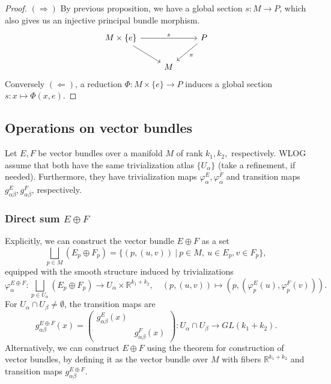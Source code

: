 \documentclass[10pt, a4paper]{article}
\newenvironment{noticeC}{%
  \tcolorbox[%
  notitle,
  empty,
  enhanced,  %
  breakable,
  coltext=black, 
  fontupper=\rmfamily,
  noparskip,
  sharp corners,
  boxrule=-1pt,  %
  frame hidden,
  left=7pt,  %
  right=7pt,
  top=5pt,
  bottom=5pt,
  before skip=2.5ex plus 2pt,
  after skip=2.5ex plus 2pt,
  overlay unbroken and last={%
  },
  ]}
{\endtcolorbox}
\newenvironment{myproof}%
  {\begin{noticeC}\begin{proof}}%
  {\end{proof}\end{noticeC}}
\newcommand{\R}{\mathbb {R}}
\begin{document}
\begin{myproof}
  $(\Rightarrow)$ By previous proposition, we have a global section $s: M \to P$, which also gives us an injective principal bundle morphism.
  \[\begin{tikzcd}
    {M \times \{e\}} && P \\
    & M
    \arrow["s", from=1-1, to=1-3]
    \arrow[from=1-1, to=2-2]
    \arrow["\pi", from=1-3, to=2-2]
  \end{tikzcd}\]
  Conversely $(\Leftarrow)$, a reduction $\Phi: M \times \{e\} \to P$ induces a global section $s: x \mapsto \Phi(x, e)$.
\end{myproof}

\subsection{Operations on vector bundles}

Let $E, F$ be vector bundles over a manifold $M$ of rank $k_1, k_2,$ respectively.
WLOG assume that both have the same trivialization atlas $\{U_\alpha\}$ (take a refinement, if needed).
Furthermore, they have trivialization maps $\varphi_\alpha ^E, \varphi_\alpha ^F$ and transition maps 
$g_{\alpha \beta} ^E, g_{\alpha \beta} ^F$, respectively. 

\subsubsection*{Direct sum $E \oplus F$}

Explicitly, we can construct the vector bundle $E \oplus F$ as a set 
$$\bigsqcup_{p \in M} (E_p \oplus F_p) = \{(p, (u, v))\ |\ p  \in M,\ u \in E_p, v \in F_p\},$$
equipped with the smooth structure induced by trivializations 
$$\varphi_\alpha ^{E \oplus F} : \bigsqcup_{p \in U_\alpha} (E_p \oplus F_p) \to U_\alpha \times \R^{k_1 + k_2},\quad (p, (u, v)) \mapsto (p, (\varphi_p ^E (u), \varphi_p ^F (v))).$$
For $U_\alpha \cap U_\beta \neq \emptyset$, the transition maps are
$$g_{\alpha \beta} ^{E \oplus F} (x) = \begin{pmatrix}
  g_{\alpha \beta} ^E (x) & \\
  & g_{\alpha \beta} ^F (x)
\end{pmatrix}: U_\alpha \cap U_\beta \to GL(k_1 + k_2).$$
Alternatively, we can construct $E \oplus F$ using the theorem for construction of vector bundles,
by defining it as the vector bundle over $M$ with fibers $\R^{k_1 + k_2}$ and transition maps $g_{\alpha \beta} ^{E \oplus F}$.
\end{document}
